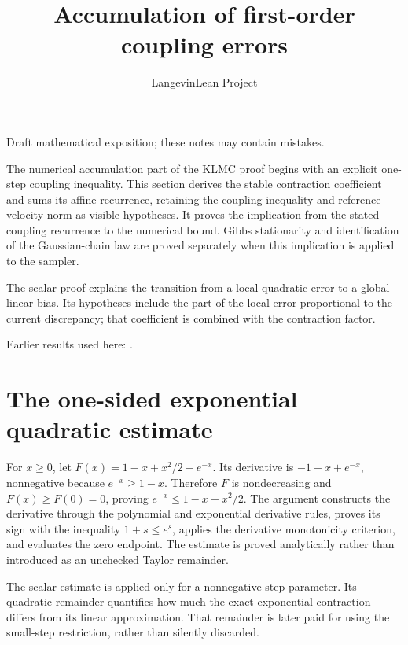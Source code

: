 \documentclass[11pt,a4paper]{article}
\title{\texorpdfstring{Accumulation of first-order coupling errors}{Accumulation of first-order coupling errors}}
\author{LangevinLean Project}
\date{}
\begin{document}
\maketitle
Draft mathematical exposition; these notes may contain mistakes.


The numerical accumulation part of the KLMC proof begins with an explicit one-step coupling inequality. This section derives the stable contraction coefficient and sums its affine recurrence, retaining the coupling inequality and reference velocity norm as visible hypotheses. It proves the implication from the stated coupling recurrence to the numerical bound. Gibbs stationarity and identification of the Gaussian-chain law are proved separately when this implication is applied to the sampler.



The scalar proof explains the transition from a local quadratic error to a global linear bias. Its hypotheses include the part of the local error proportional to the current discrepancy; that coefficient is combined with the contraction factor.



Earlier results used here: \cite[Section~3.15]{LangevinLean2026ULASC}.

\section{\texorpdfstring{The one-sided exponential quadratic estimate}{The one-sided exponential quadratic estimate}}


For \(x\ge0\), let \(F(x)=1-x+x^2/2-e^{-x}\). Its derivative is \(-1+x+e^{-x}\), nonnegative because \(e^{-x}\ge1-x\). Therefore \(F\) is nondecreasing and \(F(x)\ge F(0)=0\), proving \(e^{-x}\le1-x+x^2/2\). The argument constructs the derivative through the polynomial and exponential derivative rules, proves its sign with the inequality \(1+s\le e^s\), applies the derivative monotonicity criterion, and evaluates the zero endpoint. The estimate is proved analytically rather than introduced as an unchecked Taylor remainder.



The scalar estimate is applied only for a nonnegative step parameter. Its quadratic remainder quantifies how much the exact exponential contraction differs from its linear approximation. That remainder is later paid for using the small-step restriction, rather than silently discarded.
\end{document}
